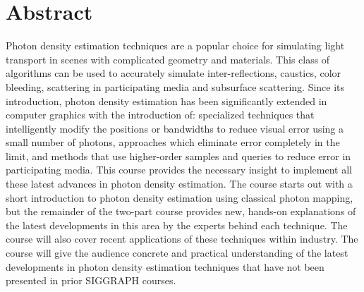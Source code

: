 \documentclass[11pt,fleqn]{book} %
\begin{document}



\pagestyle{plain}

{\baselineskip=18pt

\cleardoublepage
{}
{}
\section*{Abstract}

Photon density estimation techniques are a popular choice for simulating light transport in scenes with complicated geometry and materials. This class of algorithms can be used to accurately simulate inter-reflections, caustics, color bleeding, scattering in participating media and subsurface scattering. Since its introduction, photon density estimation has been significantly extended in computer graphics with the introduction of: specialized techniques that intelligently modify the positions or bandwidths to reduce visual error using a small number of photons, approaches which eliminate error completely in the limit, and methods that use higher-order samples and queries to reduce error in participating media. This course provides the necessary insight to implement all these latest advances in photon density estimation. The course starts out with a short introduction to photon density estimation using classical photon mapping, but the remainder of the two-part course provides new, hands-on explanations of the latest developments in this area by the experts behind each technique. The course will also cover recent applications of these techniques within industry. The course will give the audience concrete and practical understanding of the latest developments in photon density estimation techniques that have not been presented in prior SIGGRAPH courses.

}

\clearpage



{}
\end{document}
